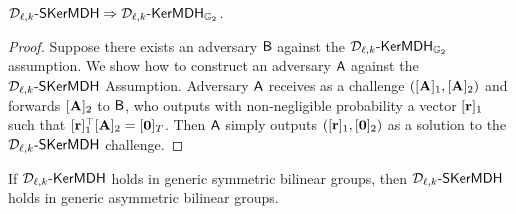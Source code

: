 \begin{lemma} $\mathcal{D}_{\ell,k}\mbox{-}\mathsf{SKerMDH} \Rightarrow \mathcal{D}_{\ell,k}\mbox{-}\mathsf{KerMDH}_{\mathbb{G}_2}$.
\end{lemma}
\begin{proof} Suppose there exists an adversary $\mathsf{B}$ against the 
$\mathcal{D}_{\ell,k}\mbox{-}\mathsf{KerMDH}_{\mathbb{G}_2}$ assumption. We show how to construct an adversary $\mathsf{A}$ against the  $\mathcal{D}_{\ell,k}\mbox{-}\mathsf{SKerMDH}$ Assumption. Adversary $\mathsf{A}$ receives as a challenge $([\mathbf{{A}}]_1,[\mathbf{{A}}]_2)$ and forwards $[\mathbf{{A}}]_2$ to $\mathsf{B}$, who outputs with non-negligible probability a vector $[\mathbf{r}]_1$ such that $[\mathbf{r}]_1^{\top} [\mathbf{{A}}]_2=[\mathbf{0}]_{T}$. Then $\mathsf{A}$  simply outputs $([\mathbf{r}]_1,[\mathbf{0}]_2)$ as a solution to the $\mathcal{D}_{\ell,k}\mbox{-}\mathsf{SKerMDH}$ challenge. 
\end{proof}

\begin{lemma} If $\mathcal{D}_{\ell,k}\mbox{-}\mathsf{KerMDH}$ holds in generic symmetric bilinear groups, then $\mathcal{D}_{\ell,k}\mbox{-}\mathsf{SKerMDH}$ holds in generic asymmetric bilinear groups. 
\end{lemma}

